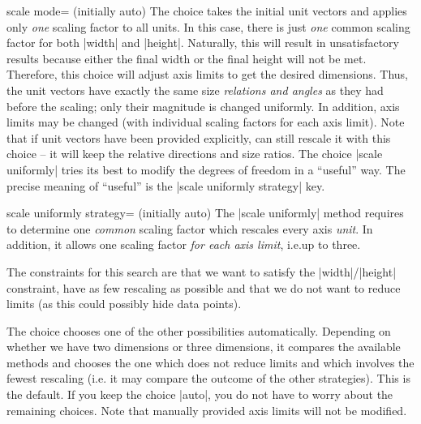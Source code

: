\begin{pgfplotskey}{scale mode= (initially auto)}
    The choice  takes the initial unit vectors and
    applies only \emph{one} scaling factor to all units. In this case, there is
    just \emph{one} common scaling factor for both |width| and |height|.
    Naturally, this will result in unsatisfactory results because either the
    final width or the final height will not be met. Therefore, this choice
    will adjust axis limits to get the desired dimensions. Thus, the unit
    vectors have exactly the same size \emph{relations and angles} as they had
    before the scaling; only their magnitude is changed uniformly. In addition,
    axis limits may be changed (with individual scaling factors for each axis
    limit). Note that if unit vectors have been provided explicitly,
    \PGFPlots{} can still rescale it with this choice -- it will keep the
    relative directions and size ratios. The choice |scale uniformly| tries its
    best to modify the degrees of freedom in a ``useful'' way. The precise
    meaning of ``useful'' is the |scale uniformly strategy| key.

    \begin{pgfplotskey}{scale uniformly strategy= (initially auto)%
    }
        The |scale uniformly| method requires to determine one \emph{common}
        scaling factor which rescales every axis \emph{unit}. In addition, it
        allows one scaling factor \emph{for each axis limit}, i.e.\@ up to
        three.

        The constraints for this search are that we want to satisfy the
        |width|/|height| constraint, have as few rescaling as possible and that
        we do not want to reduce limits (as this could possibly hide data
        points).

        The choice  chooses one of the other possibilities
        automatically. Depending on whether we have two dimensions or three
        dimensions, it compares the available methods and chooses the one which
        does not reduce limits and which involves the fewest rescaling (i.e.\@
        it may compare the outcome of the other strategies). This is the
        default. If you keep the choice |auto|, you do not have to worry about
        the remaining choices. Note that manually provided axis limits will not
        be modified.


\end{pgfplotskey}
\end{pgfplotskey}
